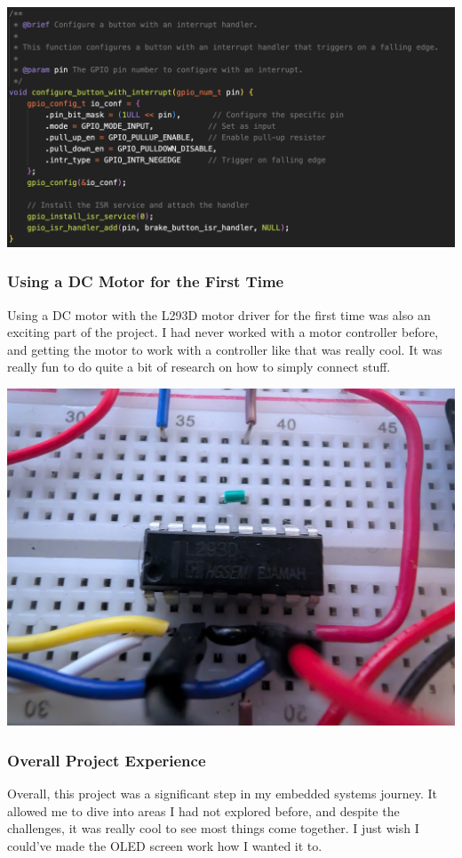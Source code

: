 \includegraphics[scale=0.25]{img/configure.png}

\subsubsection{Using a DC Motor for the First Time}
Using a DC motor with the L293D motor driver for the first time was also an exciting part of the project. I had never worked with a motor controller before, and getting the motor to work with a controller like that was really cool. It was really fun to do quite a bit of research on how to simply connect stuff.

\includegraphics[scale=0.10]{img/L293D.png}

\subsubsection{Overall Project Experience}
Overall, this project was a significant step in my embedded systems journey. It allowed me to dive into areas I had not explored before, and despite the challenges, it was really cool to see most things come together. I just wish I could've made the OLED screen work how I wanted it to.

\newpage
